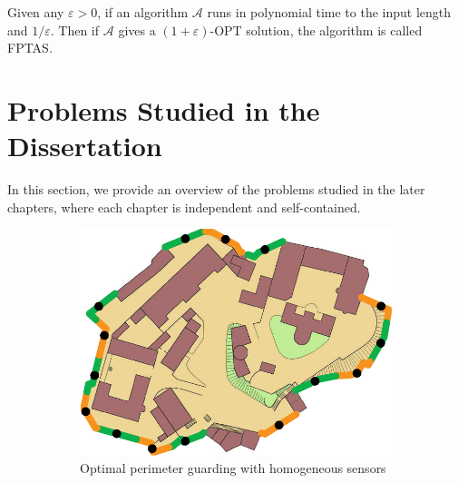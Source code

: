 \begin{definition}
    Given any $\varepsilon>0$, if an algorithm $\mathcal A$ runs in polynomial time to the input length and $1/\varepsilon$. 
    Then if $\mathcal A$ gives a $(1+\varepsilon)$-OPT solution, the algorithm is called FPTAS.
\end{definition}
\section{Problems Studied in the Dissertation}
In this section, we provide an overview of the problems studied in the later chapters, 
where each chapter is independent and self-contained. 

\begin{figure}[h]
    \centering
    \begin{subfigure}[b]{0.4\textwidth}
        \centering
        \includegraphics[width = \textwidth]{chapters/opg/figures/castle_15-eps-converted-to.pdf}
        \caption{Optimal perimeter guarding with homogeneous sensors}
        \label{fig:intro-opg-ho}
    \end{subfigure}
    \begin{subfigure}[b]{0.4\textwidth}
        \centering

\end{subfigure}
\end{figure}
